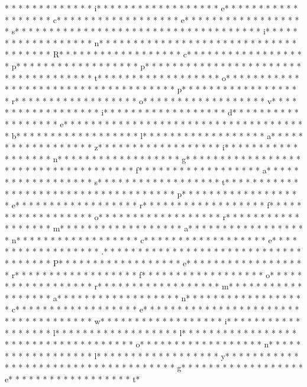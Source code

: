 *  * * *  *  * * *  *  * * *  * i* * *  * * *  * * *  *  * * *  *  * * *  * e* * *  * * *  * * *  *  * * *  *  * * *  * c* * *  * * *  * * *  *  * * *  *  * * *  * e* * *  * * *  * * *  *  * * *  *  * * *  * s* * *  * * *  * * *  *  * * *  *  * * *  *  * * *  * * *  * * *  *  * * *  *  * * *  * i* * *  * * *  * * *  *  * * *  *  * * *  * n* * *  * * *  * * *  *  * * *  *  * * *  *  * * *  * * *  * * *  *  * * *  *  * * *  * R* * *  * * *  * * *  *  * * *  *  * * *  * c* * *  * * *  * * *  *  * * *  *  * * *  * p* * *  * * *  * * *  *  * * *  *  * * *  * p* * *  * * *  * * *  *  * * *  *  * * *  *  * * *  * * *  * * *  *  * * *  *  * * *  * t* * *  * * *  * * *  *  * * *  *  * * *  * o* * *  * * *  * * *  *  * * *  *  * * *  *  * * *  * * *  * * *  *  * * *  *  * * *  * p* * *  * * *  * * *  *  * * *  *  * * *  * r* * *  * * *  * * *  *  * * *  *  * * *  * o* * *  * * *  * * *  *  * * *  *  * * *  * v* * *  * * *  * * *  *  * * *  *  * * *  * i* * *  * * *  * * *  *  * * *  *  * * *  * d* * *  * * *  * * *  *  * * *  *  * * *  * e* * *  * * *  * * *  *  * * *  *  * * *  *  * * *  * * *  * * *  *  * * *  *  * * *  * b* * *  * * *  * * *  *  * * *  *  * * *  * l* * *  * * *  * * *  *  * * *  *  * * *  * a* * *  * * *  * * *  *  * * *  *  * * *  * z* * *  * * *  * * *  *  * * *  *  * * *  * i* * *  * * *  * * *  *  * * *  *  * * *  * n* * *  * * *  * * *  *  * * *  *  * * *  * g* * *  * * *  * * *  *  * * *  *  * * *  *  * * *  * * *  * * *  *  * * *  *  * * *  * f* * *  * * *  * * *  *  * * *  *  * * *  * a* * *  * * *  * * *  *  * * *  *  * * *  * s* * *  * * *  * * *  *  * * *  *  * * *  * t* * *  * * *  * * *  *  * * *  *  * * *  *  * * *  * * *  * * *  *  * * *  *  * * *  * p* * *  * * *  * * *  *  * * *  *  * * *  * e* * *  * * *  * * *  *  * * *  *  * * *  * r* * *  * * *  * * *  *  * * *  *  * * *  * f* * *  * * *  * * *  *  * * *  *  * * *  * o* * *  * * *  * * *  *  * * *  *  * * *  * r* * *  * * *  * * *  *  * * *  *  * * *  * m* * *  * * *  * * *  *  * * *  *  * * *  * a* * *  * * *  * * *  *  * * *  *  * * *  * n* * *  * * *  * * *  *  * * *  *  * * *  * c* * *  * * *  * * *  *  * * *  *  * * *  * e* * *  * * *  * * *  *  * * *  *  * * *  * .* * *  * * *  * * *  *  * * *  *  * * *  *  * * *  * * *  * * *  *  * * *  *  * * *  * P* * *  * * *  * * *  *  * * *  *  * * *  * e* * *  * * *  * * *  *  * * *  *  * * *  * r* * *  * * *  * * *  *  * * *  *  * * *  * f* * *  * * *  * * *  *  * * *  *  * * *  * o* * *  * * *  * * *  *  * * *  *  * * *  * r* * *  * * *  * * *  *  * * *  *  * * *  * m* * *  * * *  * * *  *  * * *  *  * * *  * a* * *  * * *  * * *  *  * * *  *  * * *  * n* * *  * * *  * * *  *  * * *  *  * * *  * c* * *  * * *  * * *  *  * * *  *  * * *  * e* * *  * * *  * * *  *  * * *  *  * * *  *  * * *  * * *  * * *  *  * * *  *  * * *  * w* * *  * * *  * * *  *  * * *  *  * * *  * i* * *  * * *  * * *  *  * * *  *  * * *  * l* * *  * * *  * * *  *  * * *  *  * * *  * l* * *  * * *  * * *  *  * * *  *  * * *  *  * * *  * * *  * * *  *  * * *  *  * * *  * o* * *  * * *  * * *  *  * * *  *  * * *  * n* * *  * * *  * * *  *  * * *  *  * * *  * l* * *  * * *  * * *  *  * * *  *  * * *  * y* * *  * * *  * * *  *  * * *  *  * * *  *  * * *  * * *  * * *  *  * * *  *  * * *  * g* * *  * * *  * * *  *  * * *  *  * * *  * e* * *  * * *  * * *  *  * * *  *  * * *  * t* 